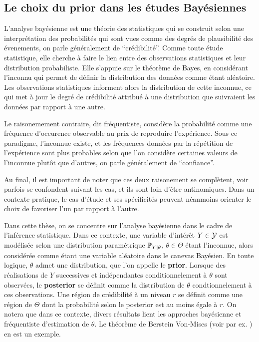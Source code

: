 \subsection{Le choix du prior dans les études Bayésiennes}



L'analyse bayésienne est une théorie des statistiques qui se construit selon une interprétation des probabilités qui sont vues comme des degrés de plausibilité des évenements, on parle généralement de ``crédibilité''. 
Comme toute étude statistique, elle cherche à faire le lien entre des observations statistiques et leur distribution probabiliste. %
Elle s'appuie sur le théorème de Bayes, en considérant l'inconnu qui permet de définir la distribution des données comme étant aléatoire. Les observations statistiques informent alors la distribution de cette inconnue, ce qui met  à jour le degré de crédibilité attribué à une distribution que suivraient les données par rapport à une autre.


Le raisonemement contraire, dit fréquentiste, considère la probabilité comme une fréquence d'occurence observable au prix de reproduire l'expérience. Sous ce paradigme, l'inconnue existe, 
et les fréquences données par la répétition de l'expérience sont plus probables selon que l'on considère certaines valeurs de l'inconnue plutôt que d'autres, on parle généralement de ``confiance''.


Au final, il est important de noter que ces deux raisonement se complètent, voir parfois se confondent suivant les cas, et ils sont loin d'être antinomiques. Dans un contexte pratique, le cas d'étude et ses spécificités peuvent néanmoins orienter le choix de favoriser l'un par rapport à l'autre.


Dans cette thèse, on se concentre sur l'analyse bayésienne dans le cadre de l'inférence statistique. Dans ce contexte, une variable d'intérêt $Y\in\mathcal{Y}$ est modélisée selon une distribution paramétrique $\mathbb{P}_{Y|\theta}$, $\theta\in\Theta$ étant l'inconnue, alors considérée comme étant une variable aléatoire dans le canevas Bayésien.
En toute logique, $\theta$ admet une distribution, que l'on appelle le \textbf{prior}.
Lorsque des réalisations de $Y$ successives et indépendantes conditionnelement à $\theta$ sont observées, le \textbf{posterior} se définit comme la distribution de $\theta$ condtionnelement à ces observations. Une région de crédibilité à un niveau $r$ se définit comme une région de $\Theta$ dont la probabilité selon le posterior est au moins égale à $r$.
On notera que dans ce contexte, divers résultats lient les approches bayésienne et fréquentiste d'estimation de $\theta$. Le théorème de Berstein Von-Mises (voir par ex. \cite{van_der_vaart_asymptotic_1992}) en est un exemple.


